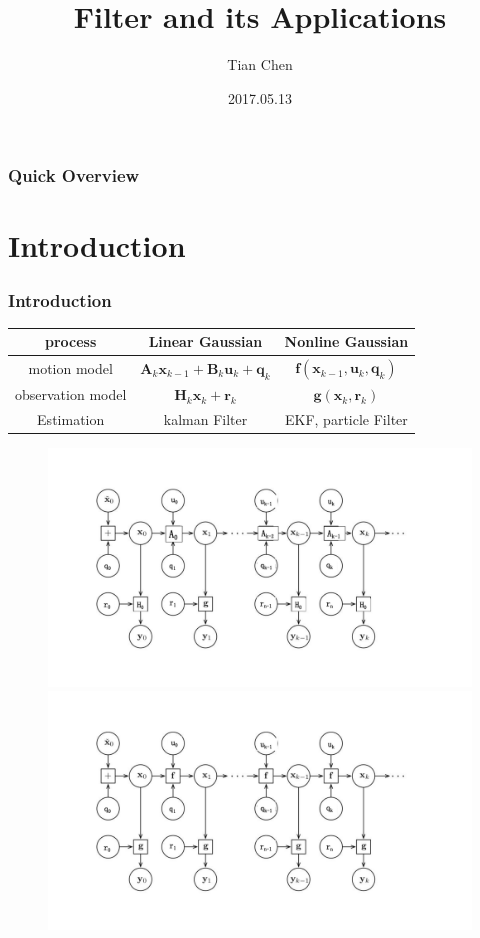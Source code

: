 \documentclass[14pt,hyperref={CJKbookmarks=true}]{beamer}
\theoremstyle{plain}
\theoremstyle{definition}
\theoremstyle{remark}
\begin{document}


\title[IACAS]{Filter and its Applications}
\author{Tian Chen}
\date[]{2017.05.13}


\begin{frame}
\titlepage
\end{frame}




\begin{frame}
\frametitle{Quick Overview} 
\small\tableofcontents
\end{frame}

\section{Introduction}
\frame{\tableofcontents[currentsection]}
\begin{frame}
\frametitle{Introduction} 
\begin{table}
\small
\begin{tabular}{c c c }
\toprule[1pt]
process & Linear Gaussian &Nonline Gaussian\\
\midrule[0.5pt]
motion model &$\mathbf{A}_{k}\mathbf{x}_{k-1}+\mathbf{B}_{k}\mathbf{u}_{k}+\mathbf{q}_{k}$ & $\mathbf{f}(\mathbf{x}_{k-1},\mathbf{u}_{k},\mathbf{q}_{k})$\\
observation model &  $\mathbf{H}_k\mathbf{x}_k+\mathbf{r}_k$ &  $\mathbf{g}(\mathbf{x}_k,\mathbf{r}_k)$ \\
Estimation & kalman Filter& EKF, particle Filter\\
\bottomrule[1pt]
\end{tabular}
\end{table}
\begin{figure}
\centering
\includegraphics[width=0.45\linewidth]{state1.pdf}
\quad
\includegraphics[width=0.45\linewidth]{state2.pdf}
\end{figure}

\end{frame}
\end{document}
